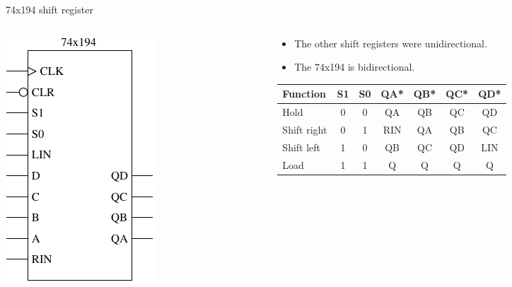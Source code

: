 \begin{frame}{74x194 shift register}
  \begin{columns}
    \begin{column}{3cm}
      \begin{center}
        \includegraphics[scale=0.8]{74x194Schematic}
      \end{center}
    \end{column}
      \begin{column}{9cm}
        \begin{itemize}
          \item The other shift registers were \alert{unidirectional}.
          \item The 74x194 is \alert{bidirectional}.
        \end{itemize}
        \begin{center}
          \begin{tabular}{l|cc|cccc}
            \textbf{Function} & \textbf{S1} & \textbf{S0} & \textbf{QA*} & \textbf{QB*} & \textbf{QC*} & \textbf{QD*} \\
            \hline
            Hold & 0 & 0 & QA & QB & QC & QD \\
            Shift right & 0 & 1 & RIN & QA & QB & QC \\
            Shift left & 1 & 0 & QB & QC & QD & LIN \\
            Load & 1 & 1 & Q & Q & Q & Q \\
          \end{tabular}
        \end{center}
      \end{column}
  \end{columns}
\end{frame}

